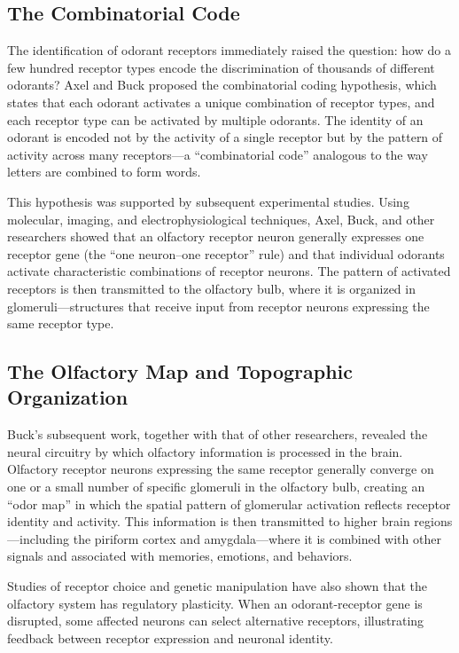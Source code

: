 \subsection{The Combinatorial Code}

The identification of odorant receptors immediately raised the question: how do a few hundred receptor types encode the discrimination of thousands of different odorants? Axel and Buck proposed the combinatorial coding hypothesis, which states that each odorant activates a unique combination of receptor types, and each receptor type can be activated by multiple odorants. The identity of an odorant is encoded not by the activity of a single receptor but by the pattern of activity across many receptors---a ``combinatorial code'' analogous to the way letters are combined to form words.

This hypothesis was supported by subsequent experimental studies. Using molecular, imaging, and electrophysiological techniques, Axel, Buck, and other researchers showed that an olfactory receptor neuron generally expresses one receptor gene (the ``one neuron--one receptor'' rule) and that individual odorants activate characteristic combinations of receptor neurons. The pattern of activated receptors is then transmitted to the olfactory bulb, where it is organized in glomeruli---structures that receive input from receptor neurons expressing the same receptor type.

\subsection{The Olfactory Map and Topographic Organization}

Buck's subsequent work, together with that of other researchers, revealed the neural circuitry by which olfactory information is processed in the brain. Olfactory receptor neurons expressing the same receptor generally converge on one or a small number of specific glomeruli in the olfactory bulb, creating an ``odor map'' in which the spatial pattern of glomerular activation reflects receptor identity and activity. This information is then transmitted to higher brain regions---including the piriform cortex and amygdala---where it is combined with other signals and associated with memories, emotions, and behaviors.

Studies of receptor choice and genetic manipulation have also shown that the olfactory system has regulatory plasticity. When an odorant-receptor gene is disrupted, some affected neurons can select alternative receptors, illustrating feedback between receptor expression and neuronal identity.

